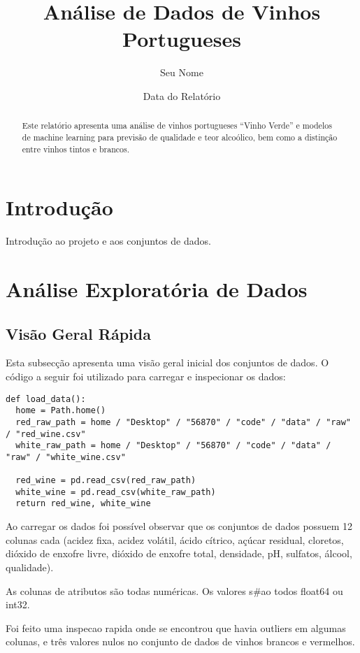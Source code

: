 \documentclass{article}
\title{Análise de Dados de Vinhos Portugueses}
\author{Seu Nome}
\date{Data do Relatório}
\begin{document}
\maketitle

\begin{abstract}
Este relatório apresenta uma análise de vinhos portugueses ``Vinho Verde'' e modelos de machine learning para previsão de qualidade e teor alcoólico, bem como a distinção entre vinhos tintos e brancos.
\end{abstract}

\section{Introdução}
Introdução ao projeto e aos conjuntos de dados.

\section{Análise Exploratória de Dados}

\subsection{Visão Geral Rápida}
Esta subsecção apresenta uma visão geral inicial dos conjuntos de dados. O código a seguir foi utilizado para carregar e inspecionar os dados:

\begin{verbatim}
def load_data():
  home = Path.home()
  red_raw_path = home / "Desktop" / "56870" / "code" / "data" / "raw" / "red_wine.csv"
  white_raw_path = home / "Desktop" / "56870" / "code" / "data" / "raw" / "white_wine.csv"

  red_wine = pd.read_csv(red_raw_path)
  white_wine = pd.read_csv(white_raw_path)
  return red_wine, white_wine
\end{verbatim}

Ao carregar os dados foi possível observar que os conjuntos de dados possuem 12 colunas cada (acidez fixa, acidez volátil, ácido cítrico, açúcar residual, cloretos, dióxido de enxofre livre, dióxido de enxofre total, densidade, pH, sulfatos, álcool, qualidade).

As colunas de atributos são todas numéricas. Os valores s#ao todos float64 ou int32.

Foi feito uma inspecao rapida onde se encontrou que havia outliers em algumas colunas, e três valores nulos no conjunto de dados de vinhos brancos e vermelhos.
\end{document}
